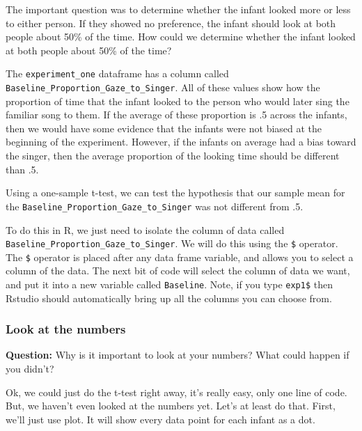 \documentclass[]{book}
\newenvironment{Shaded}{\begin{snugshade}}{\end{snugshade}}
\newcommand{\StringTok}[1]{\textcolor[rgb]{0.31,0.60,0.02}{{#1}}}
\newcommand{\NormalTok}[1]{{#1}}
\theoremstyle{definition}
\theoremstyle{definition}
\theoremstyle{definition}
\theoremstyle{remark}
\begin{document}
The important question was to determine whether the infant looked more
or less to either person. If they showed no preference, the infant
should look at both people about 50\% of the time. How could we
determine whether the infant looked at both people about 50\% of the
time?

The \texttt{experiment\_one} dataframe has a column called
\texttt{Baseline\_Proportion\_Gaze\_to\_Singer}. All of these values
show how the proportion of time that the infant looked to the person who
would later sing the familiar song to them. If the average of these
proportion is .5 across the infants, then we would have some evidence
that the infants were not biased at the beginning of the experiment.
However, if the infants on average had a bias toward the singer, then
the average proportion of the looking time should be different than .5.

Using a one-sample t-test, we can test the hypothesis that our sample
mean for the \texttt{Baseline\_Proportion\_Gaze\_to\_Singer} was not
different from .5.

To do this in R, we just need to isolate the column of data called
\texttt{Baseline\_Proportion\_Gaze\_to\_Singer}. We will do this using
the \texttt{\$} operator. The \texttt{\$} operator is placed after any
data frame variable, and allows you to select a column of the data. The
next bit of code will select the column of data we want, and put it into
a new variable called \texttt{Baseline}. Note, if you type
\texttt{exp1\$} then Rstudio should automatically bring up all the
columns you can choose from.

\begin{Shaded}
\end{Shaded}

\subsubsection{Look at the numbers}\label{look-at-the-numbers}

\textbf{Question:} Why is it important to look at your numbers? What
could happen if you didn't?

Ok, we could just do the t-test right away, it's really easy, only one
line of code. But, we haven't even looked at the numbers yet. Let's at
least do that. First, we'll just use plot. It will show every data point
for each infant as a dot.
\end{document}
